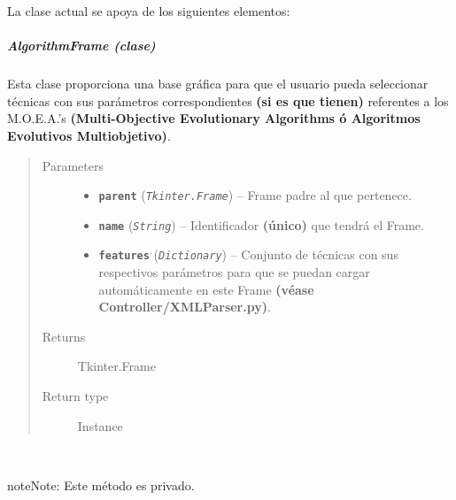 \documentclass[class=report, crop=false]{standalone}
\begin{document}

La clase actual se apoya de los siguientes elementos:

\subparagraph{AlgorithmFrame (clase)}
\label{sec:a_3_2_6_1_1}
\begin{fulllineitems}

\begin{DUlineblock}{0em}
\item[] Esta clase proporciona una base gráfica para que el 
usuario pueda seleccionar técnicas con sus parámetros 
correspondientes \textbf{(si es que tienen)} referentes a los 
M.O.E.A.'s \textbf{(Multi-Objective Evolutionary Algorithms ó Algoritmos Evolutivos Multiobjetivo)}.
\end{DUlineblock}

\begin{quote}\begin{description}
\item[{Parameters}] \leavevmode\begin{itemize}
\item \textbf{\texttt{parent}} (\emph{\texttt{Tkinter.Frame}}) -- Frame padre al que pertenece.
\item \textbf{\texttt{name}} (\emph{\texttt{String}}) -- Identificador \textbf{(único)} que tendrá el Frame.
\item \textbf{\texttt{features}} (\emph{\texttt{Dictionary}}) -- Conjunto de técnicas con sus respectivos parámetros para que se puedan cargar automáticamente en este Frame \textbf{(véase Controller/XMLParser.py)}.
\end{itemize}

\item[{Returns}] \leavevmode
Tkinter.Frame
\item[{Return type}] \leavevmode
Instance
\end{description}\end{quote}


\begin{fulllineitems}

~

\begin{notice}{note}{Note:}
Este método es privado.
\end{notice}


\end{fulllineitems}
\end{fulllineitems}
\end{document}
